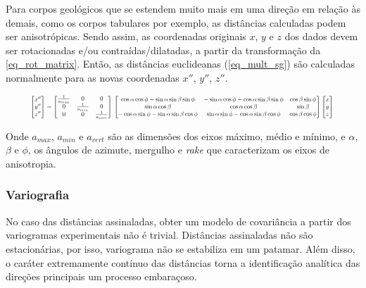 Para corpos geológicos que se estendem muito mais em uma direção em relação às demais, como os corpos tabulares por exemplo, as distâncias calculadas podem ser anisotrópicas. Sendo assim, as coordenadas originais $x$, $y$ e $z$ dos dados devem ser rotacionadas e/ou contraídas/dilatadas, a partir da transformação da \autoref{eq_rot_matrix}. Então, as distâncias euclideanas (\autoref{eq_mult_sg}) são calculadas normalmente para as novas coordenadas $x''$, $y''$, $z''$.

\begin{equation}
\resizebox{.9 \textwidth}{!}{%
$
\begin{bmatrix} x'' \\ y'' \\ z'' \end{bmatrix} = \begin{bmatrix} \frac{1}{a_{max}} & 0 & 0 \\ 0 & \frac{1}{a_{min}} & 0 \\ 0 & 0 & \frac{1}{a_{vert}} \end{bmatrix} \\ \begin{bmatrix}\cos\alpha\cos\phi-\sin\alpha\sin\beta\sin\phi & -\sin\alpha\cos\phi-\cos\alpha\sin\beta\sin\phi & \cos\beta\sin\phi \\ \sin\alpha\cos\beta & \cos\alpha\cos\beta & \sin\beta \\ -\cos\alpha\sin\phi-\sin\alpha\sin\beta\cos\phi & \sin\alpha\sin\phi-\cos\alpha\sin\beta\cos\phi & \cos\beta\cos\phi \end{bmatrix} \begin{bmatrix} x \\ y \\ z \end{bmatrix}
$
}
\label{eq_rot_matrix}
\end{equation}

Onde $a_{max}$, $a_{min}$ e $a_{vert}$ são as dimensões dos eixos máximo, médio e mínimo, e $\alpha$, $\beta$ e $\phi$, os ângulos de azimute, mergulho e \textit{rake} que caracterizam os eixos de anisotropia.

\subsubsection{Variografia}

No caso das distâncias assinaladas, obter um modelo de covariância a partir dos variogramas experimentais não é trivial. Distâncias assinaladas não são estacionárias, por isso, variograma não se estabiliza em um patamar. Além disso, o caráter extremamente contínuo das distâncias torna a identificação analítica das direções principais um processo embaraçoso.

